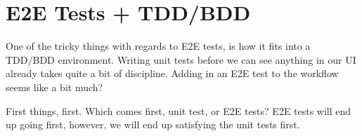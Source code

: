 \maketitle{}
\section{ E2E Tests + TDD/BDD }

One of the tricky things with regards to E2E tests, is how it fits into a
TDD/BDD environment. Writing unit tests before we can see anything in our UI
already takes quite a bit of discipline. Adding in an E2E test to the workflow
seems like a bit much?

First things, first. Which comes first, unit test, or E2E tests? E2E tests will
end up going first, however, we will end up satisfying the unit tests first.
